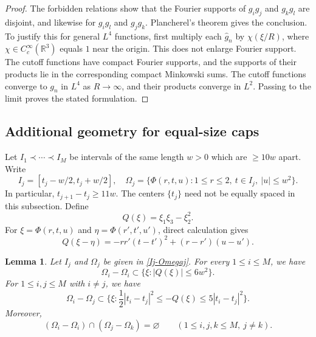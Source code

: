 \documentclass{amsart}
\numberwithin{equation}{section}
\newtheorem{lemma}[theorem]{Lemma}
\newcommand{\wh}{\widehat}
\newcommand{\ZR}{\mathbb{R}}
\begin{document}
\begin{proof}
The forbidden relations show that the Fourier supports of $g_i g_j$ and $g_k g_l$ are disjoint, and likewise for $g_i g_l$ and $g_j g_k$.
Plancherel's theorem gives the conclusion.
To justify this for general $L^4$ functions, first multiply each $\wh g_n$ by $\chi(\xi/R)$, where $\chi\in C_c^\infty(\ZR^3)$ equals $1$ near the origin. 
This does not enlarge Fourier support.
The cutoff functions have compact Fourier supports, and the supports of their products lie in the corresponding compact Minkowski sums. 
The cutoff functions converge to $g_n$ in $L^4$ as $R\longrightarrow\infty$, and their products converge in $L^2$.
Passing to the limit proves the stated formulation.
\end{proof}

\medskip 

\subsection{Additional geometry for equal-size caps}
\label{sec:equal-cap-geometry}

Let $I_1\prec\cdots\prec I_M$ be intervals of the same length $w>0$ which are $\geq10w$ apart.
Write
\begin{equation}
\label{Ij-Omegaj}
    I_j=[t_j-w/2,t_j+w/2],\quad
    \Omega_j=\{\Phi(r,t,u):1\leq r\leq2,\ t\in I_j,
    \ |u|\leq w^2\}.
\end{equation}
In particular, $t_{j+1}-t_j\geq11w$.
The centers $\{t_j\}$ need not be equally spaced in this subsection. 
Define
\[
    Q(\xi)=\xi_1\xi_3-\xi_2^2.
\]
For $\xi=\Phi(r,t,u)$ and $\eta=\Phi(r',t',u')$, direct calculation gives
\begin{equation}
\label{cone-q-identity}
    Q(\xi-\eta)=-rr'(t-t')^2+(r-r')(u-u').
\end{equation}

\begin{samepage}
\begin{lemma}
\label{cone-difference-lem}
Let $I_j$ and $\Omega_j$ be given in \eqref{Ij-Omegaj}.
For every $1\leq i\leq M$, we have
\begin{equation}
\label{cone-same-cap-difference}
    \Omega_i-\Omega_i\subset\{\xi:|Q(\xi)|\leq6w^2\}.
\end{equation}
For $1\leq i,j\leq M$ with $i\ne j$, we have
\begin{equation}
\label{cone-difference-comparison}
    \Omega_i-\Omega_j\subset
    \Big\{\xi:\frac12|t_i-t_j|^2\leq -Q(\xi)
    \leq5|t_i-t_j|^2\Big\}.
\end{equation}
Moreover,
\begin{equation}
\label{cone-repeated-separation}
    (\Omega_i-\Omega_i)\cap(\Omega_j-\Omega_k)=\varnothing
    \qquad(1\leq i,j,k\leq M,\ j\ne k).
\end{equation}
\end{lemma}
\end{samepage}
\end{document}
